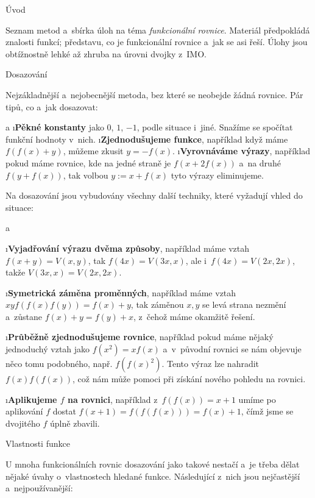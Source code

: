 





\sec Úvod

Seznam metod a~sbírka úloh na téma \textit{funkcionální rovnice}. Materiál předpokládá znalosti funkcí; představu, co je funkcionální rovnice a~jak se asi řeší. Úlohy jsou obtížnostně lehké až zhruba na úrovni dvojky z~IMO.

\sec Dosazování

Nejzákladnější a~nejobecnější metoda, bez které se neobejde žádná rovnice. Pár tipů, co a~jak dosazovat:

\begitems \style a
\i \textbf{Pěkné konstanty} jako $0$, $1$, $-1$, podle situace i~jiné. Snažíme se spočítat funkční hodnoty v~nich.
\i \textbf{Zjednodušujeme funkce}, například když máme $f(f(x)+y)$, můžeme zkusit $y=-f(x)$.
\i \textbf{Vyrovnáváme výrazy}, například pokud máme rovnice, kde na jedné straně je $f(x+2f(x))$ a~na druhé $f(y+f(x))$, tak volbou $y:=x+f(x)$ tyto výrazy eliminujeme.
\enditems

Na dosazování jsou vybudovány všechny další techniky, které vyžadují vhled do situace:

\begitems \style a

\i \textbf{Vyjadřování výrazu dvěma způsoby}, například máme vztah $f(x+y)=V(x,y)$, tak $f(4x)=V(3x,x)$, ale i~$f(4x)=V(2x,2x)$, takže $V(3x,x)=V(2x,2x)$.

\i \textbf{Symetrická záměna proměnných}, například máme vztah $xyf(f(x)f(y))=f(x)+y$, tak záměnou $x,y$ se levá strana nezmění a~zůstane $f(x)+y=f(y)+x$, z~čehož máme okamžitě řešení.

\i \textbf{Průběžně zjednodušujeme rovnice}, například pokud máme nějaký jednoduchý vztah jako $f(x^2)=xf(x)$ a~v~původní rovnici se nám objevuje něco tomu podobného, např. $f(f(x)^2)$. Tento výraz lze nahradit $f(x)f(f(x))$, což nám může pomoci při získání nového pohledu na rovnici.

\i \textbf{Aplikujeme $f$ na rovnici}, například z~$f(f(x))=x+1$ umíme po aplikování $f$ dostat $f(x+1)=f(f(f(x)))=f(x)+1$, čímž jsme se dvojitého $f$ úplně zbavili.

\enditems

\sec Vlastnosti funkce

U mnoha funkcionálních rovnic dosazování jako takové nestačí a~je třeba dělat nějaké úvahy o~vlastnostech hledané funkce. Následující z~nich jsou nejčastější a~nejpoužívanější:

